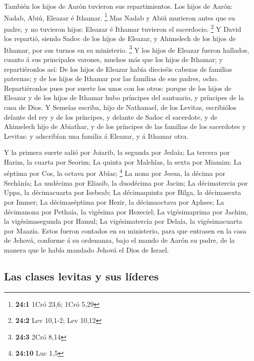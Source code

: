  También los hijos de Aarón tuvieron sus repartimientos. Los
hijos de Aarón: Nadab, Abiú, Eleazar é Ithamar. \footnote{\textbf{24:1}
  1Cró 23,6; 1Cró 5,29}  Mas Nadab y Abiú murieron antes que
su padre, y no tuvieron hijos: Eleazar é Ithamar tuvieron el sacerdocio.
\footnote{\textbf{24:2} Lev 10,1-2; Lev 10,12}  Y David los
repartió, siendo Sadoc de los hijos de Eleazar, y Ahimelech de los hijos
de Ithamar, por sus turnos en su ministerio. \footnote{\textbf{24:3}
  2Cró 8,14}  Y los hijos de Eleazar fueron hallados, cuanto
á sus principales varones, muchos más que los hijos de Ithamar; y
repartiéronlos así: De los hijos de Eleazar había dieciséis cabezas de
familias paternas; y de los hijos de Ithamar por las familias de sus
padres, ocho.  Repartiéronlos pues por suerte los unos con
los otros: porque de los hijos de Eleazar y de los hijos de Ithamar hubo
príncipes del santuario, y príncipes de la casa de Dios.  Y
Semeías escriba, hijo de Nathanael, de los Levitas, escribiólos delante
del rey y de los príncipes, y delante de Sadoc el sacerdote, y de
Ahimelech hijo de Abiathar, y de los príncipes de las familias de los
sacerdotes y Levitas: y adscribían una familia á Eleazar, y á Ithamar
otra.

 Y la primera suerte salió por Joiarib, la segunda por
Jedaía;  La tercera por Harim, la cuarta por Seorim;
 La quinta por Malchîas, la sexta por Miamim; 
La séptima por Cos, la octava por Abías; \footnote{\textbf{24:10} Luc
  1,5}  La nona por Jesua, la décima por Sechânía;
 La undécima por Eliasib, la duodécima por Jacim;
 La décimatercia por Uppa, la décimacuarta por Isebeab;
 La décimaquinta por Bilga, la décimasexta por Immer;
 La décimaséptima por Hezir, la décimaoctava por Aphses;
 La décimanona por Pethaía, la vigésima por Hezeciel;
 La vigésimaprima por Jachim, la vigésimasegunda por Hamul;
 La vigésimatercia por Delaía, la vigésimacuarta por
Maazía.  Estos fueron contados en su ministerio, para que
entrasen en la casa de Jehová, conforme á su ordenanza, bajo el mando de
Aarón su padre, de la manera que le había mandado Jehová el Dios de
Israel.

\hypertarget{las-clases-levitas-y-sus-luxedderes}{%
\subsection{Las clases levitas y sus
líderes}\label{las-clases-levitas-y-sus-luxedderes}}

